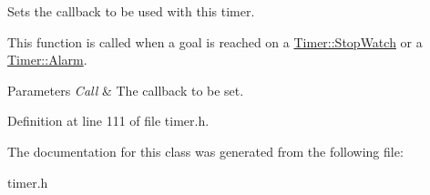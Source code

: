 Sets the callback to be used with this timer. 

This function is called when a goal is reached on a \hyperlink{classMezzanine_1_1Timer_a1db436d4e0d6f1676e41ba3cb2ea3aaaae421b07061ca1f45a2f1080316c3dbb7}{Timer::StopWatch} or a \hyperlink{classMezzanine_1_1Timer_a1db436d4e0d6f1676e41ba3cb2ea3aaaad408501a2b2ad050dce4591e1735a6a2}{Timer::Alarm}. 
\begin{DoxyParams}{Parameters}
{\em Call} & The callback to be set. \\
\hline
\end{DoxyParams}


Definition at line 111 of file timer.h.



The documentation for this class was generated from the following file:\begin{DoxyCompactItemize}
\item 
timer.h\end{DoxyCompactItemize}
